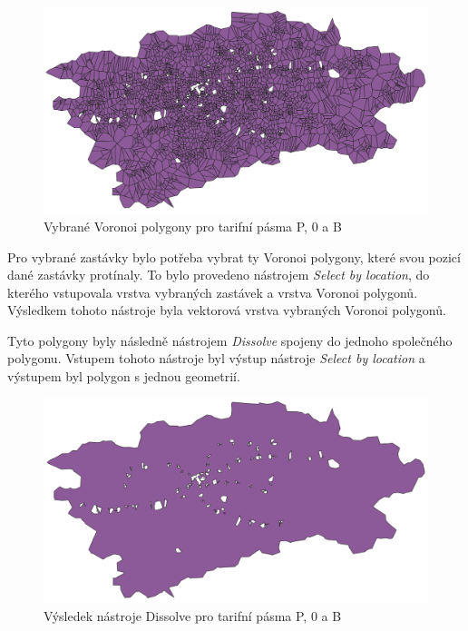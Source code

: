 \begin{figure}[H] \centering
    \includegraphics[width=400pt]{./pictures/voronoi-selected-P0B.png}
    \caption[Vybrané Voronoi polygony pro tarifní pásma P, 0 a B]{Vybrané Voronoi polygony pro tarifní pásma P, 0 a B}
	\label{fig:voronoi-selected}              
\end{figure}

Pro vybrané zastávky bylo potřeba vybrat ty Voronoi polygony, které svou
pozicí dané zastávky protínaly. To bylo provedeno nástrojem \textit{Select by location},
do kterého vstupovala vrstva vybraných zastávek a vrstva Voronoi polygonů. Výsledkem tohoto nástroje byla
vektorová vrstva vybraných Voronoi polygonů.

Tyto polygony byly následně nástrojem \textit{Dissolve} spojeny do jednoho společného polygonu.
Vstupem tohoto nástroje byl výstup nástroje \textit{Select by location} a vý\-stupem byl polygon
s jednou geometrií. 

\begin{figure}[H] \centering
    \includegraphics[width=400pt]{./pictures/dissolve-P0B.png}
    \caption[Výsledek nástroje Dissolve pro tarifní pásma P, 0 a B]{Výsledek nástroje Dissolve pro tarifní pásma P, 0 a B}
	\label{fig:dissolve}              
\end{figure} 

